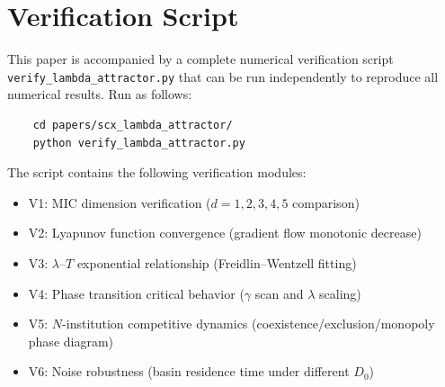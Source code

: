 \documentclass[12pt,a4paper]{article}
\theoremstyle{definition}
\newcommand{\lb}{\lambda}
\begin{document}
\newpage
\section*{Verification Script}
\noindent
This paper is accompanied by a complete numerical verification script \texttt{verify\_lambda\_attractor.py} that can be run independently to reproduce all numerical results. Run as follows:
\begin{verbatim}
    cd papers/scx_lambda_attractor/
    python verify_lambda_attractor.py
\end{verbatim}

The script contains the following verification modules:
\begin{itemize}
    \item V1: MIC dimension verification ($d=1,2,3,4,5$ comparison)
    \item V2: Lyapunov function convergence (gradient flow monotonic decrease)
    \item V3: $\lb$--$T$ exponential relationship (Freidlin--Wentzell fitting)
    \item V4: Phase transition critical behavior ($\gamma$ scan and $\lb$ scaling)
    \item V5: $N$-institution competitive dynamics (coexistence/exclusion/monopoly phase diagram)
    \item V6: Noise robustness (basin residence time under different $D_0$)
\end{itemize}
\end{document}
